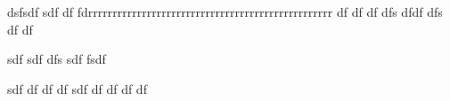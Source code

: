 dsfsdf
sdf
df
fdrrrrrrrrrrrrrrrrrrrrrrrrrrrrrrrrrrrrrrrrrrrrrrrrrr
df
df
df
dfs
dfdf
dfs
df
df

















sdf
sdf
dfs
sdf
fsdf

sdf
df
df
df
sdf
df
df
df
df
